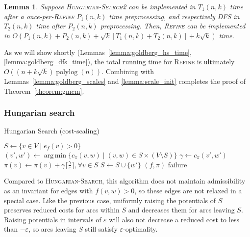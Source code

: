 \documentclass[11pt]{article}
\def\polylog{\mathop{\mathrm{polylog}}}
\def\eps{\varepsilon}
\DeclareMathOperator*{\argmin}{arg\,min}
\theoremstyle{plain}
\newtheorem{lemma}{Lemma}
\begin{document}
\begin{lemma}
	Suppose \textsc{Hungarian-Search2} can be implemented in $T_1(n, k)$ 
	time after a once-per-\textsc{Refine} $P_1(n, k)$ time preprocessing,
	and respectively \textsc{DFS} in $T_2(n, k)$ time after $P_2(n, k)$ 
	preprocessing.
	Then, \textsc{Refine} can be implemented in 
	$O(P_1(n, k) + P_2(n, k) + \sqrt{k}[T_1(n, k) + T_2(n, k)] + k\sqrt{k})$ 
	time.
\end{lemma}

As we will show shortly (Lemmas~\ref{lemma:goldberg_hs_time}, 
\ref{lemma:goldberg_dfs_time}), the total running time for \textsc{Refine}
is ultimately $O((n + k\sqrt{k})\polylog(n))$.
Combining with Lemmas~\ref{lemma:goldberg_scales} and \ref{lemma:scale_init}
completes the proof of Theorem~\ref{theorem:gmcm}.

\subsubsection{Hungarian search}

\begin{algorithm}
\caption{Hungarian Search (cost-scaling)}
\begin{algorithmic}[1]
	\State $S \gets \{v \in V \mid e_f(v) > 0\}$
	\Repeat
		\State $(v', w') \gets \argmin\{c_\pi(v, w) \mid (v, w) \in S \times (V \setminus S)\}$
		\State $\gamma \gets c_\pi(v', w')$
			\State $\pi(v) \gets \pi(v) + \gamma\lceil\frac{\gamma}{\eps}\rceil, \forall v \in S$
		\EndIf
		\State $S \gets S \cup \{w'\}$
		\Statex %
		 
			\State\Return $(f, \pi)$
		\EndIf
	\State\Return failure
\EndFunction
\end{algorithmic}
\end{algorithm}

Compared to \textsc{Hungarian-Search}, this algorithm does not maintain 
admissibility as an invariant for edges with $f(v, w) > 0$, so these edges are 
not relaxed in a special case.
Like the previous case, uniformly raising the potentials of $S$ preserves 
reduced costs for arcs within $S$ and decreases them for arcs leaving $S$.
Raising potentials in intervals of $\eps$ will also not decrease a reduced
cost to less than $-\eps$, so arcs leaving $S$ still satisfy $\eps$-optimality.
\end{document}
